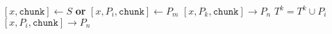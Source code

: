 \documentclass{article}
\begin{document}
\pagestyle{empty}

\newcommand{\send}{\Rightarrow}
\newcommand{\sendto}{\rightarrow}
\algrenewcommand{}

\begin{algorithmic}

  \State $[x,\mathtt{chunk}] \gets S$ \textbf{or} $[x,P_i,\mathtt{chunk}] \gets P_m$
  \State $[x,P_k,\mathtt{chunk}] \sendto P_n$
  \EndFor
  \EndIf
  \State $T^k = T^k \cup P_i$
  \EndIf
  \State $[x,P_i,\mathtt{chunk}] \sendto P_n$
  \EndIf
  \EndFor
  \EndIf
  \EndWhile
  \EndProcedure
  
\end{algorithmic}
\end{document}
